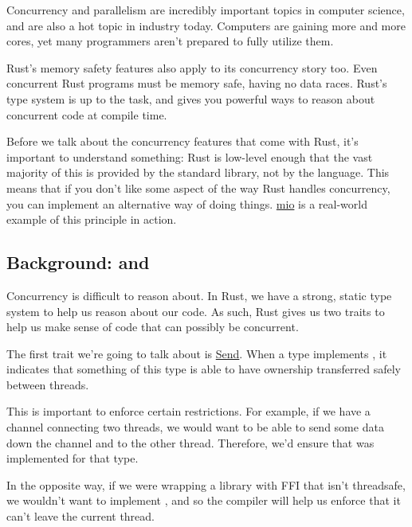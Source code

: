 Concurrency and parallelism are incredibly important topics in computer science, and are also a hot topic in industry today. 
Computers are gaining more and more cores, yet many programmers aren't prepared to fully utilize them.

\blank

Rust's memory safety features also apply to its concurrency story too. Even concurrent Rust programs must be memory safe, having 
no data races. Rust's type system is up to the task, and gives you powerful ways to reason about concurrent code at compile time.

\blank

Before we talk about the concurrency features that come with Rust, it's important to understand something: Rust is low-level enough 
that the vast majority of this is provided by the standard library, not by the language. This means that if you don't like some aspect 
of the way Rust handles concurrency, you can implement an alternative way of doing things. \href{https://github.com/carllerche/mio}{mio} 
is a real-world example of this principle in action.

\subsection*{Background:  and }

Concurrency is difficult to reason about. In Rust, we have a strong, static type system to help us reason about our code. As such, 
Rust gives us two traits to help us make sense of code that can possibly be concurrent.


The first trait we're going to talk about is \href{https://doc.rust-lang.org/std/marker/trait.Send.html}{Send}. When a type  
implements , it indicates that something of this type is able to have ownership transferred safely between threads.

\blank

This is important to enforce certain restrictions. For example, if we have a channel connecting two threads, we would want to be 
able to send some data down the channel and to the other thread. Therefore, we'd ensure that  was implemented for that type.

\blank

In the opposite way, if we were wrapping a library with FFI that isn't threadsafe, we wouldn't want to implement , 
and so the compiler will help us enforce that it can't leave the current thread.

